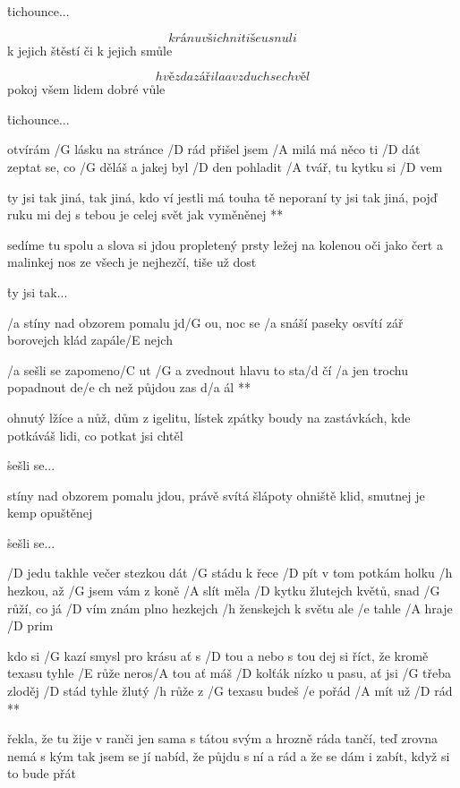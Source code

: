 \r tichounce...

\[ k ránu všichni tiše usnuli \]
k jejich štěstí či k jejich smůle \s

\[ hvězda zářila a vzduch se chvěl \]
pokoj všem lidem dobré vůle

\r tichounce...




otvírám /G lásku na stránce /D rád
přišel jsem /A milá má něco ti /D dát
zeptat se, co /G děláš a jakej byl /D den
pohladit /A tvář, tu kytku si /D vem

\R ty jsi tak jiná, tak jiná, kdo ví
   jestli má touha tě neporaní
   ty jsi tak jiná, pojď ruku mi dej
   s tebou je celej svět jak vyměněnej **

sedíme tu spolu a slova si jdou
propletený prsty ležej na kolenou
oči jako čert a malinkej nos
ze všech je nejhezčí, tiše už dost

\r ty jsi tak...




/a stíny nad obzorem pomalu jd/G ou, noc se /a snáší
paseky osvítí zář borovejch klád zapále/E nejch

\R /a sešli se zapomeno/C ut /G a zvednout hlavu to sta/d čí
   /a jen trochu popadnout de/e ch než půjdou zas d/a ál **

ohnutý lžíce a nůž, dům z igelitu, lístek zpátky
boudy na zastávkách, kde potkáváš lidi, co potkat jsi chtěl

\r sešli se...

stíny nad obzorem pomalu jdou, právě svítá
šlápoty ohniště klid, smutnej je kemp opuštěnej

\r sešli se...




/D jedu takhle večer stezkou dát /G stádu k řece /D pít
v tom potkám holku /h hezkou, až /G jsem vám z koně /A slít
měla /D kytku žlutejch květů, snad /G růží, co já /D vím
znám plno hezkejch /h ženskejch k světu ale /e tahle /A hraje /D prim

\R kdo si /G kazí smysl pro krásu ať s /D tou a nebo s tou
   dej si říct, že kromě texasu tyhle /E růže neros/A tou
   ať máš /D kolťák nízko u pasu, ať jsi /G třeba zloděj /D stád
   tyhle žlutý /h růže z /G texasu budeš /e pořád /A mít už /D rád **

řekla, že tu žije v ranči jen sama s tátou svým
a hrozně ráda tančí, teď zrovna nemá s kým
tak jsem se jí nabíd, že půjdu s ní a rád
a že se dám i zabít, když si to bude přát \s

